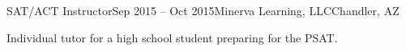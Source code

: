 
\def\PositionTitle{SAT/ACT Instructor}
\def\PositionPeriod{Sep 2015 -- Oct 2015} %
\def\OrgName{Minerva Learning, LLC}
\def\OrgLocation{Chandler, AZ}


\begin{rExperience}{\PositionTitle}{\PositionPeriod}{\OrgName}{\OrgLocation}

  \item Individual tutor for a high school student preparing for the PSAT.

\end{rExperience}
